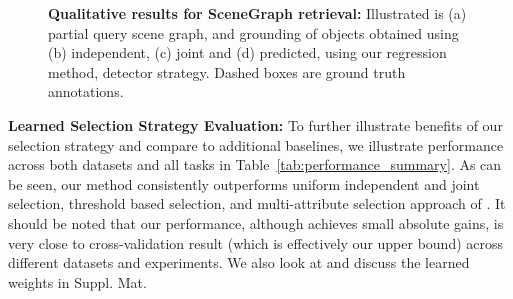 \documentclass[runningheads]{llncs}
\newcommand{\Leon}[1]{{\color{BurntOrange}{#1}}}
\newcommand{\Guy} [1]{{\color{RoyalBlue}{#1}}}
\begin{document}
\begin{figure}[t]

    \caption{{\bf Qualitative results for SceneGraph retrieval:} Illustrated is (a) partial query scene graph, and grounding of objects obtained using (b) independent, (c) joint and (d) predicted, using our regression method, detector strategy. Dashed boxes are ground truth annotations.}%
    \label{scene_graph_retrieval}%
\vspace*{-\baselineskip}
\end{figure}

\vspace{0.07in}
\noindent
{\bf Learned Selection Strategy Evaluation:}
To further illustrate benefits of our selection strategy and compare to additional baselines, we illustrate performance across both datasets and all tasks in Table~\ref{tab:performance_summary}.
As can be seen, our method consistently outperforms uniform independent and joint selection, threshold based selection, and multi-attribute selection approach of \cite{Rastegari2013}. It should be noted that our performance, although achieves small absolute gains, is very close to cross-validation result (which is effectively our upper bound) across different datasets and experiments. We also look at and discuss the learned weights in Suppl. Mat. 

\end{document}
